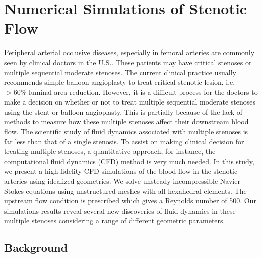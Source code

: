 \appendix
\chapter{Numerical Simulations of Stenotic Flow}

Peripheral arterial occlusive diseases, especially in femoral arteries are commonly seen by clinical doctors in the U.S.\cite{malinow1989prevalence, boger1997biochemical, hooi2001incidence}. These patients may have critical stenoses or multiple sequential moderate stenoses. The current clinical practice usually recommends simple balloon angioplasty\cite{duncan1995simple} to treat critical stenotic lesion, i.e. $ > 60 \% $ luminal area reduction. However, it is a difficult process for the doctors to make a decision on whether or not to treat multiple sequential moderate stenoses using the stent or balloon angioplasty. This is partially because of the lack of methods to measure how these multiple stenoses affect their downstream blood flow. The scientific study of fluid dynamics associated with multiple stenoses is far less than that of a single stenosis. To assist on making clinical decision for treating multiple stenoses, a quantitative approach, for instance, the computational fluid dynamics (CFD) \cite{ferziger1997computational} method is very much needed. In this study,  we present a high-fidelity CFD simulations of the blood flow in the stenotic arteries using idealized geometries. We solve unsteady incompressible Navier-Stokes equations\cite{temam1984navier} using unstructured meshes with all hexahedral elements. The upstream flow condition is prescribed which gives a Reynolds number of 500. Our simulations results reveal several new discoveries of fluid dynamics in these multiple stenoses considering a range of different geometric parameters.

\section{Background}

